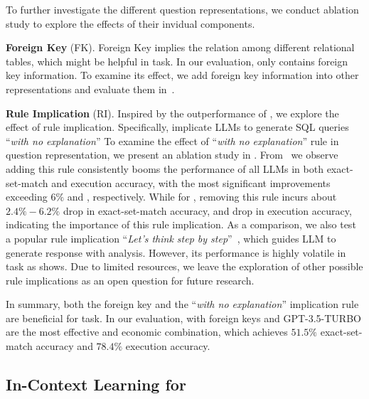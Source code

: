 To further investigate the different question representations, we conduct ablation study to explore the effects of their invidual components. 

\textbf{Foreign Key} (FK). 
Foreign Key implies the relation among different relational tables, which might be helpful in \nlsql task. 
In our evaluation, only \absqlprompt contains foreign key information. 
To examine its effect, we add foreign key information into other representations and evaluate them in~. 
 

\textbf{Rule Implication} (RI). 
Inspired by the outperformance of \abopenaiprompt, we explore the effect of rule implication. 
Specifically, \abopenaiprompt implicate LLMs to generate SQL queries ``\textit{with no explanation}''
To examine the effect of ``\textit{with no explanation}'' rule in question representation, we present an ablation study in . 
From~ we observe adding this rule consistently booms the performance of all LLMs in both exact-set-match and execution accuracy, with the most significant improvements exceeding $6\%$ and , respectively. 
While for \abopenaiprompt, removing this rule incurs about $2.4\%-6.2\%$ drop in exact-set-match accuracy, and  drop in execution accuracy, indicating the importance of this rule implication. 
As a comparison, we also test a popular rule implication ``\textit{Let's think step by step}''~\cite{kojima2022large}, which guides LLM to generate response with analysis.
However, its performance is highly volatile in \nlsql task as  shows. 
Due to limited resources, we leave the exploration of other possible rule implications as an open question for future research. 

In summary, both the foreign key and the ``\textit{with no explanation}'' implication rule are beneficial for \nlsql task.
In our evaluation, \abopenaiprompt with foreign keys and GPT-3.5-TURBO are the most effective and economic combination, which achieves $51.5\%$ exact-set-match accuracy and $78.4\%$ execution accuracy. \subsection{In-Context Learning for \nlsql}
\label{sec:chatgpt}

